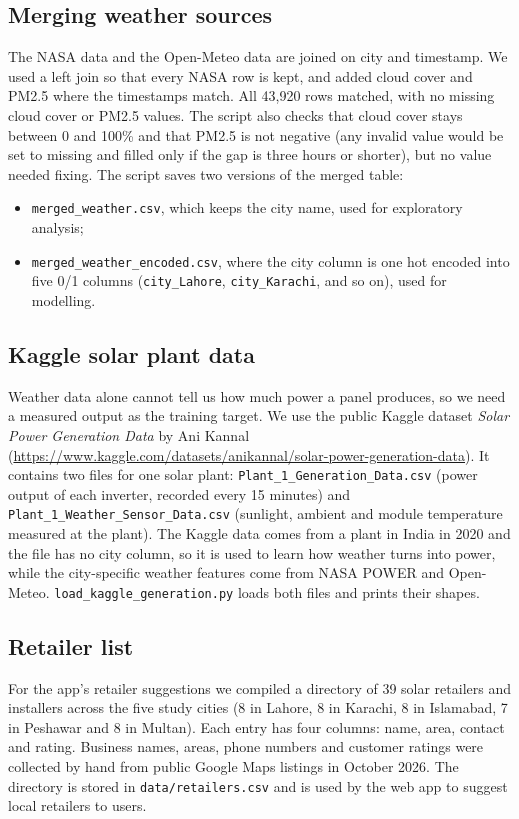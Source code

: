 \subsection{Merging weather sources}
The NASA data and the Open-Meteo data are joined on city and timestamp. We used a left join so that every NASA row is kept, and added cloud cover and PM2.5 where the timestamps match. All 43{,}920 rows matched, with no missing cloud cover or PM2.5 values. The script also checks that cloud cover stays between 0 and 100\% and that PM2.5 is not negative (any invalid value would be set to missing and filled only if the gap is three hours or shorter), but no value needed fixing. The script saves two versions of the merged table:
\begin{itemize}
  \item \texttt{merged\_weather.csv}, which keeps the city name, used for exploratory analysis;
  \item \texttt{merged\_weather\_encoded.csv}, where the city column is one hot encoded into five 0/1 columns (\texttt{city\_Lahore}, \texttt{city\_Karachi}, and so on), used for modelling.
\end{itemize}

\subsection{Kaggle solar plant data}
Weather data alone cannot tell us how much power a panel produces, so we need a measured output as the training target. We use the public Kaggle dataset \emph{Solar Power Generation Data} by Ani Kannal~\cite{kaggleplant} (\url{https://www.kaggle.com/datasets/anikannal/solar-power-generation-data}). It contains two files for one solar plant: \texttt{Plant\_1\_Generation\_Data.csv} (power output of each inverter, recorded every 15 minutes) and \texttt{Plant\_1\_Weather\_Sensor\_Data.csv} (sunlight, ambient and module temperature measured at the plant). The Kaggle data comes from a plant in India in 2020 and the file has no city column, so it is used to learn how weather turns into power, while the city-specific weather features come from NASA POWER and Open-Meteo. \texttt{load\_kaggle\_generation.py} loads both files and prints their shapes.

\subsection{Retailer list}
For the app's retailer suggestions we compiled a directory of 39 solar retailers and installers across the five study cities (8 in Lahore, 8 in Karachi, 8 in Islamabad, 7 in Peshawar and 8 in Multan). Each entry has four columns: name, area, contact and rating. Business names, areas, phone numbers and customer ratings were collected by hand from public Google Maps listings in October 2026. The directory is stored in \texttt{data/retailers.csv} and is used by the web app to suggest local retailers to users.

